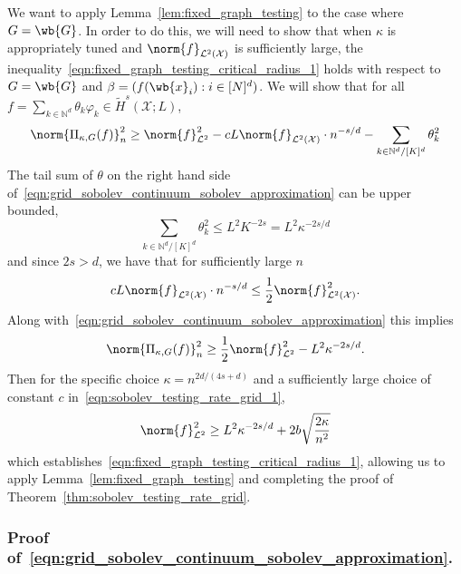 \documentclass{article}
\newcommand{\1}{\mathbf{1}}
\newcommand{\Nbb}{\mathbb{N}}
\newcommand{\Xset}{\mathcal{X}}
\newcommand{\Leb}{\mathcal{L}}
\newcommand{\wt}[1]{\widetilde{#1}}
\theoremstyle{alden}
\theoremstyle{aldenthm}
\theoremstyle{definition}
\theoremstyle{remark}
\begin{document}
We want to apply Lemma~\ref{lem:fixed_graph_testing} to the case where $G = \wb{G}$. In order to do this, we will need to show that when $\kappa$ is appropriately tuned and $\norm{f}_{\Leb^2(\mathcal{X})}$ is sufficiently large, the inequality~\eqref{eqn:fixed_graph_testing_critical_radius_1} holds with respect to $G = \wb{G}$ and $\beta = (f(\wb{x}_i): i \in [N]^d)$. We will show that for all $f = \sum_{k \in \Nbb^d} \theta_k \varphi_k \in \wt{H}^s(\Xset;L)$,
\begin{equation}
\label{eqn:grid_sobolev_continuum_sobolev_approximation}
\norm{\Pi_{\kappa,G}(f)}_n^2 \geq \norm{f}_{\Leb^2}^2 - c L \norm{f}_{\Leb^2(\Xset)} \cdot n^{-s/d} - \sum_{k \in \mathbb{N}^d/[K]^d} \theta_k^2 
\end{equation}
The tail sum of $\theta$ on the right hand side of~\eqref{eqn:grid_sobolev_continuum_sobolev_approximation} can be upper bounded,
\begin{equation*}
 \sum_{k \in \mathbb{N}^d/[K]^d} \theta_k^2  \leq L^2 K^{-2s} = L^2 \kappa^{-2s/d}
\end{equation*}
and since $2s > d$, we have that for sufficiently large $n$
\begin{equation*}
c L \norm{f}_{\Leb^2(\Xset)} \cdot n^{-s/d} \leq \frac{1}{2}\norm{f}_{\Leb^2(\Xset)}^2.
\end{equation*}
Along with~\eqref{eqn:grid_sobolev_continuum_sobolev_approximation} this implies
\begin{equation*}
\norm{\Pi_{\kappa,G}(f)}_n^2 \geq \frac{1}{2} \norm{f}_{\Leb^2}^2 - L^2 \kappa^{-2s/d}.
\end{equation*}
Then for the specific choice $\kappa = n^{2d/(4s + d)}$ and a sufficiently large choice of constant $c$ in~\eqref{eqn:sobolev_testing_rate_grid_1}, 
\begin{equation*}
\norm{f}_{\Leb^2}^2 \geq L^2 \kappa^{-2s/d} + 2b\sqrt{\frac{2\kappa}{n^2}}
\end{equation*}
which establishes~\eqref{eqn:fixed_graph_testing_critical_radius_1}, allowing us to apply Lemma~\ref{lem:fixed_graph_testing} and completing the proof of Theorem~\ref{thm:sobolev_testing_rate_grid}.

\subsubsection{Proof of~\eqref{eqn:grid_sobolev_continuum_sobolev_approximation}.}
\end{document}
